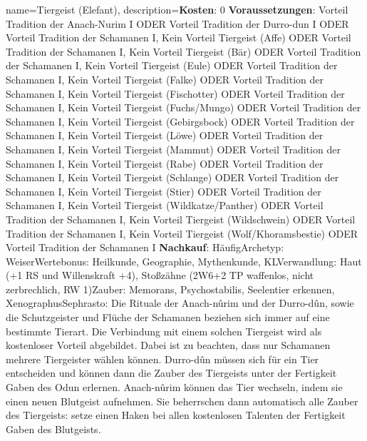 {
    name={Tiergeist (Elefant)},
    description={\textbf{Kosten}: 0 \textbf{Voraussetzungen}: Vorteil Tradition der Anach-Nurim I ODER Vorteil Tradition der Durro-dun I ODER Vorteil Tradition der Schamanen I, Kein Vorteil Tiergeist (Affe) ODER Vorteil Tradition der Schamanen I, Kein Vorteil Tiergeist (Bär) ODER Vorteil Tradition der Schamanen I, Kein Vorteil Tiergeist (Eule) ODER Vorteil Tradition der Schamanen I, Kein Vorteil Tiergeist (Falke) ODER Vorteil Tradition der Schamanen I, Kein Vorteil Tiergeist (Fischotter) ODER Vorteil Tradition der Schamanen I, Kein Vorteil Tiergeist (Fuchs/Mungo) ODER Vorteil Tradition der Schamanen I, Kein Vorteil Tiergeist (Gebirgsbock) ODER Vorteil Tradition der Schamanen I, Kein Vorteil Tiergeist (Löwe) ODER Vorteil Tradition der Schamanen I, Kein Vorteil Tiergeist (Mammut) ODER Vorteil Tradition der Schamanen I, Kein Vorteil Tiergeist (Rabe) ODER Vorteil Tradition der Schamanen I, Kein Vorteil Tiergeist (Schlange) ODER Vorteil Tradition der Schamanen I, Kein Vorteil Tiergeist (Stier) ODER Vorteil Tradition der Schamanen I, Kein Vorteil Tiergeist (Wildkatze/Panther) ODER Vorteil Tradition der Schamanen I, Kein Vorteil Tiergeist (Wildschwein) ODER Vorteil Tradition der Schamanen I, Kein Vorteil Tiergeist (Wolf/Khoramsbestie) ODER Vorteil Tradition der Schamanen I \textbf{Nachkauf}: Häufig\newline Archetyp: Weiser\newline Wertebonus: Heilkunde, Geographie, Mythenkunde, KL\newline Verwandlung: Haut (+1 RS und Willenskraft +4), Stoßzähne (2W6+2 TP waffenlos, nicht zerbrechlich, RW 1)\newline Zauber: Memorans, Psychostabilis, Seelentier erkennen, Xenographus\newline Sephrasto: Die Rituale der Anach-nûrim und der Durro-dûn, sowie die Schutzgeister und Flüche der Schamanen beziehen sich immer auf eine bestimmte Tierart. Die Verbindung mit einem solchen Tiergeist wird als kostenloser Vorteil abgebildet. Dabei ist zu beachten, dass nur Schamanen mehrere Tiergeister wählen können. Durro-dûn müssen sich für ein Tier entscheiden und können dann die Zauber des Tiergeists unter der Fertigkeit Gaben des Odun erlernen. Anach-nûrim können das Tier wechseln, indem sie einen neuen Blutgeist aufnehmen. Sie beherrschen dann automatisch alle Zauber des Tiergeists: setze einen Haken bei allen kostenlosen Talenten der Fertigkeit Gaben des Blutgeists.}
}



